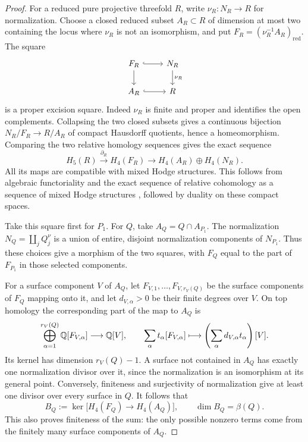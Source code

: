 \begin{proof}
For a reduced pure projective threefold $R$, write
$\nu_R\colon N_R\to R$ for normalization.  Choose a closed reduced
subset $A_R\subset R$ of dimension at most two containing the locus
where $\nu_R$ is not an isomorphism, and put
$F_R=(\nu_R^{-1}A_R)_{\mathrm{red}}$.  The square
\[
\begin{tikzcd}
 F_R \arrow[r,hook] \arrow[d] & N_R \arrow[d,"\nu_R"]\\
 A_R \arrow[r,hook] & R
\end{tikzcd}
\]
is a proper excision square.  Indeed $\nu_R$ is finite and proper and
identifies the open complements.  Collapsing the two closed subsets
gives a continuous bijection $N_R/F_R\to R/A_R$ of compact Hausdorff
quotients, hence a homeomorphism.  Comparing the two relative homology
sequences gives the exact sequence
\begin{equation}\label{eq:branch-normalization-excision}
 H_5(R)\xrightarrow{\partial_R}H_4(F_R)
 \longrightarrow H_4(A_R)\oplus H_4(N_R).
\end{equation}
All its maps are compatible with mixed Hodge structures.  This follows
from algebraic functoriality and the exact sequence of relative
cohomology as a sequence of mixed Hodge structures
\cite[Propositions~8.2.2 and 8.3.9]{DeligneHodgeIII}, followed by
duality on these compact spaces.

Take this square first for $P_1$.  For $Q$, take
$A_Q=Q\cap A_{P_1}$.  The normalization
$N_Q=\coprod_jQ_j^\nu$ is a union of entire, disjoint normalization
components of $N_{P_1}$.  Thus these choices give a morphism of the
two squares, with $F_Q$ equal to the part of $F_{P_1}$ in those
selected components.

For a surface component $V$ of $A_Q$, let
$F_{V,1},\ldots,F_{V,r_V(Q)}$ be the surface components of $F_Q$
mapping onto it, and let $d_{V,\alpha}>0$ be their finite degrees over
$V$.  On top homology the corresponding part of the map to $A_Q$ is
\[
 \bigoplus_{\alpha=1}^{r_V(Q)}\mathbb{Q}[F_{V,\alpha}]
 \longrightarrow\mathbb{Q}[V],\qquad
 \sum_\alpha t_\alpha[F_{V,\alpha}]
 \longmapsto\left(\sum_\alpha d_{V,\alpha}t_\alpha\right)[V].
\]
Its kernel has dimension $r_V(Q)-1$.  A surface not contained in
$A_Q$ has exactly one normalization divisor over it, since the
normalization is an isomorphism at its general point.  Conversely,
finiteness and surjectivity of normalization give at least one divisor
over every surface in $Q$.  It follows that
\[
 B_Q:=\ker\bigl[H_4(F_Q)\longrightarrow H_4(A_Q)\bigr],
 \qquad \dim B_Q=\beta(Q).
\]
This also proves finiteness of the sum: the only possible nonzero
terms come from the finitely many surface components of $A_Q$.


\end{proof}
